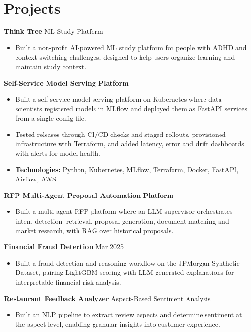 \documentclass[10pt,a4paper]{article}
\begin{document}
\section{Projects}
\textbf{Think Tree} \textbar{} ML Study Platform\par
\begin{itemize}
  \item Built a non-profit AI-powered ML study platform for people with ADHD and context-switching challenges, designed to help users organize learning and maintain study context.
\end{itemize}
\textbf{Self-Service Model Serving Platform}\par
\begin{itemize}
  \item Built a self-service model serving platform on Kubernetes where data scientists registered models in MLflow and deployed them as FastAPI services from a single config file.
  \item Tested releases through CI/CD checks and staged rollouts, provisioned infrastructure with Terraform, and added latency, error and drift dashboards with alerts for model health.
  \item \textbf{Technologies:} Python, Kubernetes, MLflow, Terraform, Docker, FastAPI, Airflow, AWS
\end{itemize}
\textbf{RFP Multi-Agent Proposal Automation Platform}\par
\begin{itemize}
  \item Built a multi-agent RFP platform where an LLM supervisor orchestrates intent detection, retrieval, proposal generation, document matching and market research, with RAG over historical proposals.
\end{itemize}
\textbf{Financial Fraud Detection} \textbar{} Mar 2025\par
\begin{itemize}
  \item Built a fraud detection and reasoning workflow on the JPMorgan Synthetic Dataset, pairing LightGBM scoring with LLM-generated explanations for interpretable financial-risk analysis.
\end{itemize}
\textbf{Restaurant Feedback Analyzer} \textbar{} Aspect-Based Sentiment Analysis\par
\begin{itemize}
  \item Built an NLP pipeline to extract review aspects and determine sentiment at the aspect level, enabling granular insights into customer experience.
\end{itemize}
\end{document}
